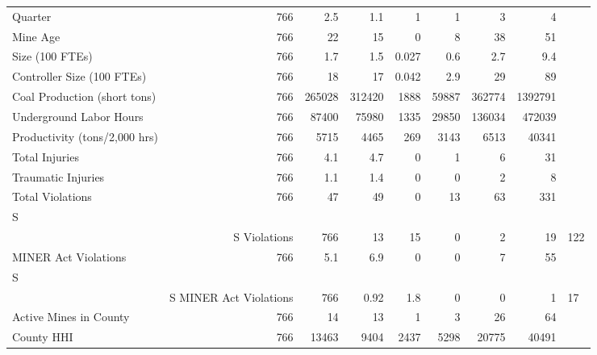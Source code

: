 \begin{table}[!htbp]
{\begin{tabular}{lrrrrrrr}
Quarter & 766 & 2.5 & 1.1 & 1 & 1 & 3 & 4 \\ 
Mine Age & 766 & 22 & 15 & 0 & 8 & 38 & 51 \\ 
Size (100 FTEs) & 766 & 1.7 & 1.5 & 0.027 & 0.6 & 2.7 & 9.4 \\ 
Controller Size (100 FTEs) & 766 & 18 & 17 & 0.042 & 2.9 & 29 & 89 \\ 
Coal Production (short tons) & 766 & 265028 & 312420 & 1888 & 59887 & 362774 & 1392791 \\ 
Underground Labor Hours & 766 & 87400 & 75980 & 1335 & 29850 & 136034 & 472039 \\ 
Productivity (tons/2,000 hrs) & 766 & 5715 & 4465 & 269 & 3143 & 6513 & 40341 \\ 
Total Injuries & 766 & 4.1 & 4.7 & 0 & 1 & 6 & 31 \\ 
Traumatic Injuries & 766 & 1.1 & 1.4 & 0 & 0 & 2 & 8 \\ 
Total Violations & 766 & 47 & 49 & 0 & 13 & 63 & 331 \\ 
S\\&S Violations & 766 & 13 & 15 & 0 & 2 & 19 & 122 \\ 
MINER Act Violations & 766 & 5.1 & 6.9 & 0 & 0 & 7 & 55 \\ 
S\\&S MINER Act Violations & 766 & 0.92 & 1.8 & 0 & 0 & 1 & 17 \\ 
Active Mines in County & 766 & 14 & 13 & 1 & 3 & 26 & 64 \\ 
County HHI & 766 & 13463 & 9404 & 2437 & 5298 & 20775 & 40491\\ 
\hline
\hline
\end{tabular}
}
\end{table}

